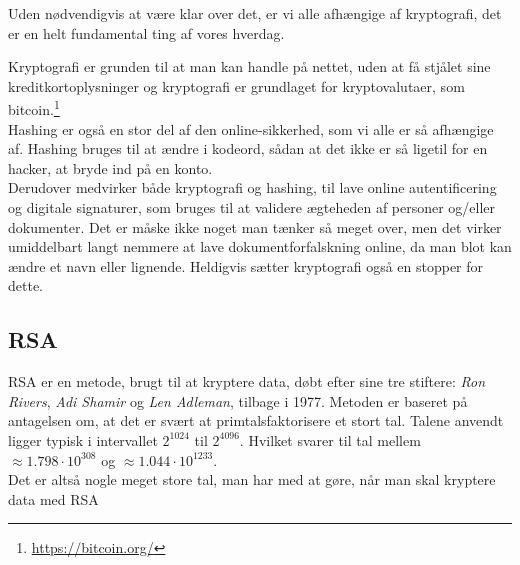 Uden nødvendigvis at være klar over det, er vi alle afhængige af kryptografi, det er en helt fundamental ting af vores hverdag.

Kryptografi er grunden til at man kan handle på nettet, uden at få stjålet sine kreditkortoplysninger og
kryptografi er grundlaget for kryptovalutaer, som bitcoin.\footnote{\url{https://bitcoin.org/}} \\
Hashing er også en stor del af den online-sikkerhed, som vi alle er så afhængige af.
Hashing bruges til at ændre i kodeord, sådan at det ikke er så ligetil for en hacker, at bryde ind på en konto.\\
Derudover medvirker både kryptografi og hashing, til lave online autentificering og digitale signaturer, som bruges til at validere ægteheden af personer og/eller dokumenter.
Det er måske ikke noget man tænker så meget over, men det virker umiddelbart langt nemmere at lave dokumentforfalskning online, da man blot kan ændre et navn eller lignende. Heldigvis sætter kryptografi også en stopper for dette.



\subsection*{RSA}
RSA er en metode, brugt til at kryptere data, døbt efter sine tre stiftere:
\textit{Ron Rivers}, \textit{Adi Shamir} og \textit{Len Adleman}, tilbage i 1977.\cite{algoritmer}
Metoden er baseret på antagelsen om, at det er svært at primtalsfaktorisere et stort tal.
Talene anvendt ligger typisk i intervallet \(2^{1024}\) til \(2^{4096}\).
Hvilket svarer til tal mellem \(\approx 1.798 \cdot 10^{308}\) og \(\approx 1.044 \cdot 10^{1233}\).\\ %
Det er altså nogle meget store tal, man har med at gøre, når man skal kryptere data med RSA

